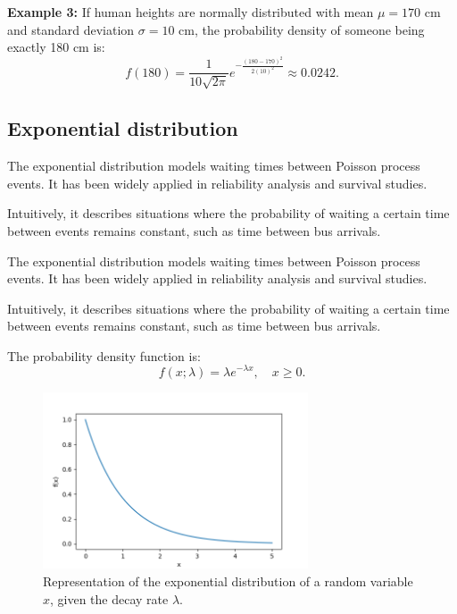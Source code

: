 \documentclass{book}
\begin{document}
\textbf{Example 3:} If human heights are normally distributed with mean $\mu=170$ cm and standard deviation $\sigma=10$ cm, the probability density of someone being exactly 180 cm is:
\begin{equation}
    f(180) = \frac{1}{10 \sqrt{2\pi}} e^{-\frac{(180-170)^2}{2(10)^2}} \approx 0.0242.
\end{equation}

\newpage
\subsection{Exponential distribution}
The exponential distribution models waiting times between Poisson process events. It has been widely applied in reliability analysis and survival studies.

Intuitively, it describes situations where the probability of waiting a certain time between events remains constant, such as time between bus arrivals.

The exponential distribution models waiting times between Poisson process events. It has been widely applied in reliability analysis and survival studies.

Intuitively, it describes situations where the probability of waiting a certain time between events remains constant, such as time between bus arrivals.

The probability density function is:
\begin{equation}
    f(x; \lambda) = \lambda e^{-\lambda x}, \quad x \geq 0.
\end{equation}

\begin{figure}[ht]
    \centering
    \includegraphics[width=0.7\textwidth]{figures/chapter2/exponential.png}
    \caption{Representation of the exponential distribution of a random variable $x$, given the decay rate $\lambda$.}
    \label{fig:random}
\end{figure}
\end{document}
